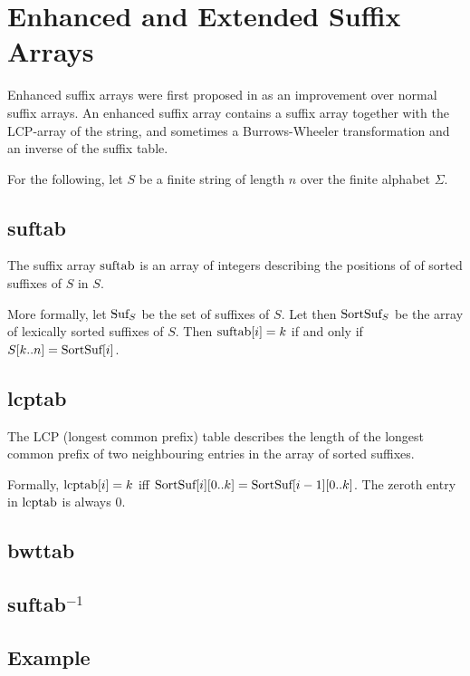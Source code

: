 \documentclass[a4paper,10pt]{article}
\begin{document}
\section*{Enhanced and Extended Suffix Arrays}

Enhanced suffix arrays were first proposed in
\citealt{abouelhoda2002enhanced} as an improvement over normal suffix
arrays. An enhanced suffix array contains a suffix array together with the
LCP-array of the string, and sometimes a Burrows-Wheeler transformation
and an inverse of the suffix table.

For the following, let $S$ be a finite string of length $n$ over the
finite alphabet $\Sigma$.

\subsection*{suftab}

The suffix array $\hbox{suftab}$ is an array of integers describing the
positions of of sorted suffixes of $S$ in $S$.

More formally, let $\hbox{Suf}_{S}$ be the set of suffixes of $S$. Let
then $\hbox{SortSuf}_{S}$ be the array of lexically sorted suffixes of
$S$. Then $\hbox{suftab}[i]=k$ if and only if $S[k..n]=\hbox{SortSuf}[i]$.

\subsection*{lcptab}

The LCP (longest common prefix) table describes the length of the longest
common prefix of two neighbouring entries in the array of sorted suffixes.

Formally, $\hbox{lcptab}[i]=k$ iff
$\hbox{SortSuf}[i][0..k]=\hbox{SortSuf}[i-1][0..k]$. The zeroth entry
in $\hbox{lcptab}$ is always $0$.

\subsection*{bwttab}

\subsection*{suftab$^{-1}$}

\subsection*{Example}
\end{document}
